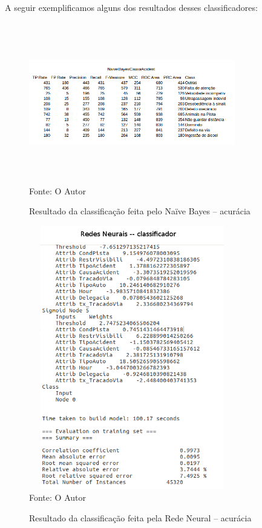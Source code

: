 A seguir exemplificamos alguns dos resultados desses classificadores:


\begin{figure}
	\centering
	\caption{Resultado da classificação feita pelo Naïve Bayes -- acurácia}
	\includegraphics[width=90mm, height=70mm]{Figuras/Resultados/NaiveBayesCausaAcident}\\
	\tiny Fonte: O Autor
	\label{fig:NaiveBayesCausaAcident}
\end{figure}


\begin{figure}
	\centering
	\caption{Resultado da classificação feita pela Rede Neural -- acurácia}
	\includegraphics[width=90mm, height=115mm]{Figuras/Resultados/RNN}\\
	\tiny Fonte: O Autor
	\label{fig:RNN}
\end{figure}



